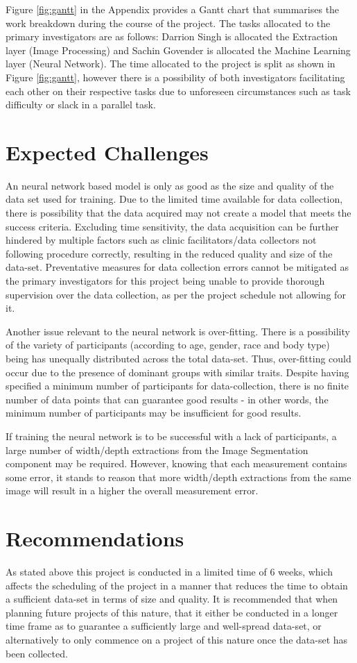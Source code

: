 \documentclass[conference]{IEEEtran}
\begin{document}
Figure \ref{fig:gantt} in the Appendix provides a Gantt chart that summarises the work breakdown during the course of the project.
The tasks allocated to the primary investigators are as follows: Darrion Singh is allocated the Extraction layer (Image Processing) and Sachin Govender is allocated the Machine Learning layer (Neural Network).
The time allocated to the project is split as shown in Figure \ref{fig:gantt}, however there is a possibility of both investigators facilitating each other on their respective tasks due to unforeseen circumstances such as task difficulty or slack in a parallel task. 
\section{Expected Challenges}
An neural network based model is only as good as the size and quality of the data set used for training.
Due to the limited time available for data collection, there is possibility that the data acquired may not create a model that meets the success criteria.
Excluding time sensitivity, the data acquisition can be further hindered by multiple factors such as clinic facilitators/data collectors not following procedure correctly, resulting in the reduced quality and size of the data-set.
Preventative measures for data collection errors cannot be mitigated as the primary investigators for this project being unable to provide thorough supervision over the data collection, as per the project schedule not allowing for it.

Another issue relevant to the neural network is over-fitting. There is a possibility of the variety of participants (according to age, gender, race and body type) being has unequally distributed across the total data-set.
Thus, over-fitting could occur due to the presence of dominant groups with similar traits.
Despite having specified a minimum number of participants for data-collection, there is no finite number of data points that can guarantee good results - in other words, the minimum number of participants may be insufficient for good results.

If training the neural network is to be successful with a lack of participants, a large number of width/depth extractions from the Image Segmentation component may be required.
However, knowing that each measurement contains some error, it stands to reason that more width/depth extractions from the same image will result in a higher the overall measurement error.
\section{Recommendations}
As stated above this project is conducted in a limited time of 6 weeks, which affects the scheduling of the project in a manner that reduces the time to obtain a sufficient data-set in terms of size and quality.
It is recommended that when planning future projects of this nature, that it either be conducted in a longer time frame as to guarantee a sufficiently large and well-spread data-set, or alternatively to only commence on a project of this nature once the data-set has been collected.
\end{document}
